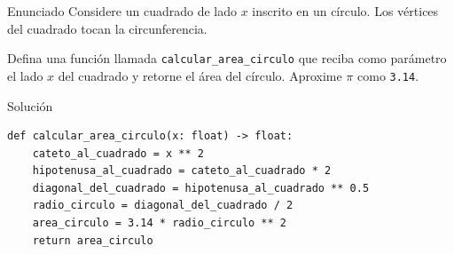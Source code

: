 \documentclass{ip-quiz}
\begin{document}
\makeheader
\maketitle

\begin{sectionbox}{Enunciado}
Considere un cuadrado de lado $x$ inscrito en un círculo. Los vértices del cuadrado tocan la circunferencia.

\begin{center}
\end{center}

Defina una función llamada \texttt{calcular\_area\_circulo} que reciba como parámetro el lado $x$ del cuadrado y retorne el área del círculo. Aproxime $\pi$ como \texttt{3.14}.
\end{sectionbox}

\begin{sectionbox}{Solución}
\begin{verbatim}
def calcular_area_circulo(x: float) -> float:
    cateto_al_cuadrado = x ** 2
    hipotenusa_al_cuadrado = cateto_al_cuadrado * 2
    diagonal_del_cuadrado = hipotenusa_al_cuadrado ** 0.5
    radio_circulo = diagonal_del_cuadrado / 2
    area_circulo = 3.14 * radio_circulo ** 2
    return area_circulo
\end{verbatim}
\end{sectionbox}
    
\end{document}
